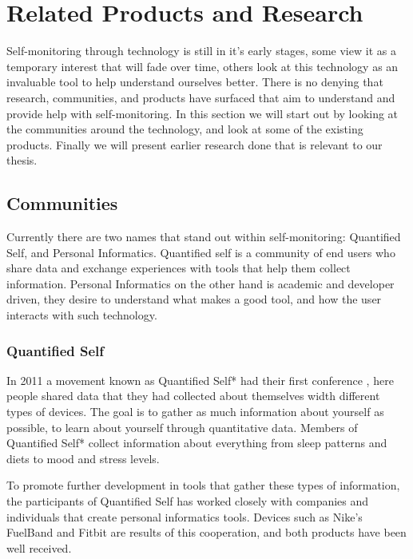 \chapter{Related Products and Research} %

\label{chapter3} %

Self-monitoring through technology is still in it's early stages, some view it as a temporary interest that will fade over time, others look at this technology as an invaluable tool to help understand ourselves better. There is no denying that research, communities, and products have surfaced that aim to understand and provide help with self-monitoring. In this section we will start out by looking at the communities around the technology, and look at some of the existing products. Finally we will present earlier research done that is relevant to our thesis.

\section{Communities}
Currently there are two names that stand out within self-monitoring: Quantified Self, and Personal Informatics. Quantified self is a community of end users who share data and exchange experiences with tools that help them collect information. Personal Informatics on the other hand is academic and developer driven, they desire to understand what makes a good tool, and how the user interacts with such technology.

\subsection{Quantified Self}
In 2011 a movement known as Quantified Self*\cite{quantifiedSelf} had their first conference \cite{bodyHackers}, here people shared data that they had collected about themselves width different types of devices. The goal is to gather as much information about yourself as possible, to learn about yourself through quantitative data. Members of Quantified Self* collect information about everything from sleep patterns and diets to mood and stress levels.

To promote further development in tools that gather these types of information, the participants of Quantified Self has worked closely with companies and individuals that create personal informatics tools. Devices such as Nike's FuelBand \cite{fuelBand} and Fitbit \cite{fitBit} are results of this cooperation, and both products have been well received.

